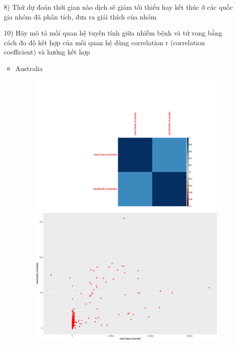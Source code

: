 \documentclass[a4paper]{article}
\theoremstyle{definition}
\begin{document}
\begin{enumerate}[i)]
\begin{enumerate}[1)]
\item[8)]  Thử dự đoán thời gian nào dịch sẽ giảm tối thiểu hay kết thúc ở các quốc gia nhóm đã phân tích, đưa ra giải thích của nhóm
\item[10)] Hãy mô tả mối quan hệ tuyến tính giữa nhiễm bệnh và tử vong bằng cách đo độ kết hợp của mối quan hệ dùng correlation r (correlation coefficient) và hướng kết hợp \\
\begin{itemize}
    \item Australia \\
     \begin{figure}[h]
      \centering
      \includegraphics[scale=0.5]{Images/CorrPlotAustralia.png}
      \includegraphics[scale=0.5]{Images/PlotAustralia-1.png}
      \label{Australia}
     \end{figure}

\end{itemize}
\end{enumerate}
\end{enumerate}
\end{document}
